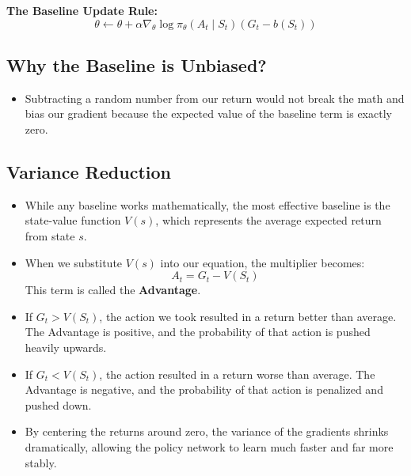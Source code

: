 \documentclass[12pt]{article}
\begin{document}
\noindent\textbf{The Baseline Update Rule:}
$$\theta \leftarrow \theta + \alpha \nabla_\theta \log \pi_\theta(A_t \mid S_t) (G_t - b(S_t))$$

\subsection*{Why the Baseline is Unbiased?}
\begin{itemize}[label=$\bullet$]
    \item Subtracting a random number from our return would not break the math and bias our gradient because the expected value of the baseline term is exactly zero.
\end{itemize}

\subsection*{Variance Reduction}
\begin{itemize}[label=$\bullet$]
    \item While any baseline works mathematically, the most effective baseline is the state-value function $V(s)$, which represents the average expected return from state $s$.
    \item When we substitute $V(s)$ into our equation, the multiplier becomes:
    $$A_t = G_t - V(S_t)$$
    This term is called the \textbf{Advantage}.
    \item If $G_t > V(S_t)$, the action we took resulted in a return better than average. The Advantage is positive, and the probability of that action is pushed heavily upwards.
    \item If $G_t < V(S_t)$, the action resulted in a return worse than average. The Advantage is negative, and the probability of that action is penalized and pushed down.
    \item By centering the returns around zero, the variance of the gradients shrinks dramatically, allowing the policy network to learn much faster and far more stably.
\end{itemize}
\end{document}
